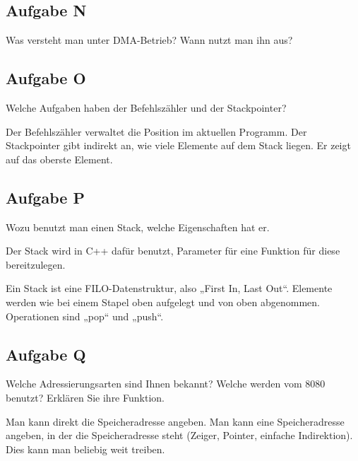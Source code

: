 \subsection{Aufgabe N}

\begin{problem}
	Was versteht man unter DMA-Betrieb? Wann nutzt man ihn aus?
\end{problem}

\fehlt

\subsection{Aufgabe O}

\begin{problem}
	Welche Aufgaben haben der Befehlszähler und der Stackpointer?
\end{problem}

Der Befehlszähler verwaltet die Position im aktuellen Programm. Der
Stackpointer gibt indirekt an, wie viele Elemente auf dem Stack liegen. Er
zeigt auf das oberste Element.

\subsection{Aufgabe P}

\begin{problem}
	Wozu benutzt man einen Stack, welche Eigenschaften hat er.
\end{problem}

Der Stack wird in C++ dafür benutzt, Parameter für eine Funktion für diese
bereitzulegen.

Ein Stack ist eine FILO-Datenstruktur, also „First In, Last Out“. Elemente
werden wie bei einem Stapel oben aufgelegt und von oben abgenommen. Operationen
sind „pop“ und „push“.

\subsection{Aufgabe Q}

\begin{problem}
	Welche Adressierungsarten sind Ihnen bekannt? Welche werden vom 8080
	benutzt? Erklären Sie ihre Funktion.
\end{problem}

Man kann direkt die Speicheradresse angeben. Man kann eine Speicheradresse
angeben, in der die Speicheradresse steht (Zeiger, Pointer, einfache
Indirektion). Dies kann man beliebig weit treiben.

